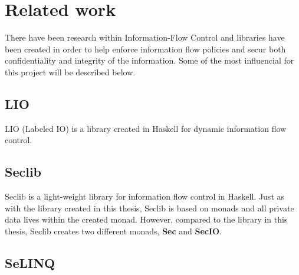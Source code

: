 \section{Related work}
\label{chapter:related}
There have been research within Information-Flow Control and libraries have been created in order to help enforce information flow policies and secur both confidentiality and integrity of the information. Some of the most influencial for this project will be described below.
\subsection{LIO}
LIO (Labeled IO) is a library created in Haskell for dynamic information flow control.\cite{lio-2011} 
\subsection{Seclib}
Seclib is a light-weight library for information flow control in Haskell.\cite{seclib, seclib_git} Just as with the library created in this thesis, Seclib is based on monads and all private data lives within the created monad. However, compared to the library in this thesis, Seclib creates two different monads, \textbf{Sec} and \textbf{SecIO}.
\subsection{SeLINQ}

